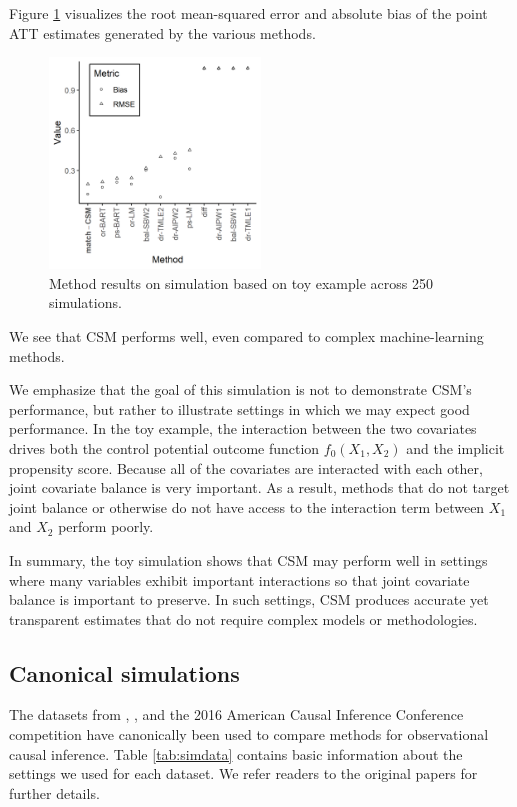 \documentclass{article}
\begin{document}
Figure \ref{fig:sim_toy_results} visualizes the root mean-squared error and absolute bias of the point ATT estimates generated by the various methods.
\begin{figure}[t]
    \centering
    \includegraphics[width=0.5\textwidth]{writeup/figures/sim_toy_results.png}
    \caption{Method results on simulation based on toy example across 250 simulations.}
    \label{fig:sim_toy_results}
\end{figure}
We see that CSM performs well, even compared to complex machine-learning methods.

We emphasize that the goal of this simulation is not to demonstrate CSM's performance, but rather to illustrate settings in which we may expect good performance.
In the toy example, the interaction between the two covariates drives both the control potential outcome function $f_0(X_1, X_2)$ and the implicit propensity score.
Because all of the covariates are interacted with each other, joint covariate balance is very important.
As a result, methods that do not target joint balance or otherwise do not have access to the interaction term between $X_1$ and $X_2$ perform poorly.

In summary, the toy simulation shows that CSM may perform well in settings where many variables exhibit important interactions so that joint covariate balance is important to preserve.
In such settings, CSM produces accurate yet transparent estimates that do not require complex models or methodologies.


\subsection{Canonical simulations}

The datasets from \citet{kang2007demystifying}, \citet{hainmueller2012entropy}, and the 2016 American Causal Inference Conference competition \citep{dorie2019automated} have canonically been used to compare methods for observational causal inference.
Table \ref{tab:simdata} contains basic information about the settings we used for each dataset.
We refer readers to the original papers for further details.
\end{document}
